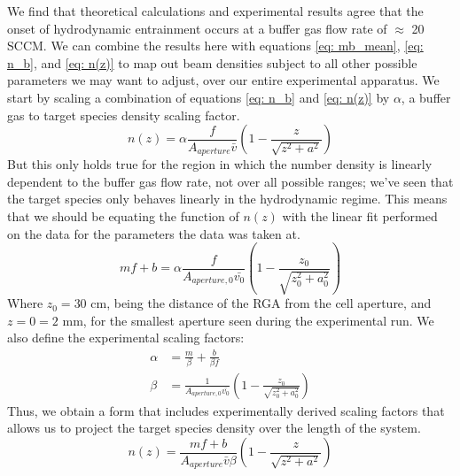 We find that theoretical calculations and experimental results agree that the onset of hydrodynamic entrainment occurs at a buffer gas flow rate of $\approx$ 20 SCCM. We can combine the results here with equations \ref{eq: mb_mean}, \ref{eq: n_b}, and \ref{eq: n(z)} to map out beam densities subject to all other possible parameters we may want to adjust, over our entire experimental apparatus. We start by scaling a combination of equations \ref{eq: n_b} and \ref{eq: n(z)} by $\alpha$, a buffer gas to target species density scaling factor.
\begin{equation*}
	n(z) = \alpha\frac{f}{A_{aperture} \bar{v}}\left(1-\frac{z}{\sqrt{z^2+a^2}}\right)
\end{equation*}
But this only holds true for the region in which the number density is linearly dependent to the buffer gas flow rate, not over all possible ranges; we've seen that the target species only behaves linearly in the hydrodynamic regime. This means that we should be equating the function of $n(z)$ with the linear fit performed on the data for the parameters the data was taken at.
\begin{equation*}
	mf+b = \alpha\frac{f}{A_{aperture, 0} \bar{v_0}}\left(1-\frac{z_0}{\sqrt{z_0^2+a_0^2}}\right) 
\end{equation*}
Where $z_0=30$ cm, being the distance of the RGA from the cell aperture, and $z=0=2$ mm, for the smallest aperture seen during the experimental run. We also define the experimental scaling factors:
\begin{align*}
	\alpha & = \frac{m}{\beta}+\frac{b}{\beta f} \\
	\beta & = \frac{1}{A_{aperture, 0} \bar{v_0}}\left(1-\frac{z_0}{\sqrt{z_0^2+a_0^2}}\right)
\end{align*}
Thus, we obtain a form that includes experimentally derived scaling factors that allows us to project the target species density over the length of the system.
\begin{equation}
	n(z) = \frac{mf+b}{A_{aperture} \bar{v} \beta}\left(1-\frac{z}{\sqrt{z^2+a^2}}\right)
	\label{eq: experimental n(z)}
\end{equation}

